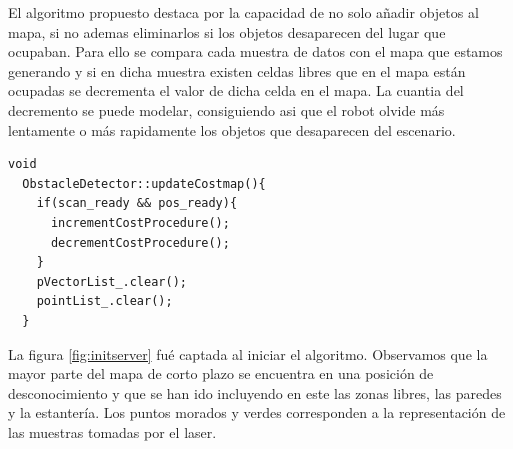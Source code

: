 El algoritmo propuesto destaca por la capacidad de no solo añadir objetos al mapa, si no ademas eliminarlos si los objetos desaparecen del lugar que ocupaban. Para ello se compara cada muestra de datos con el mapa que estamos generando y si en dicha muestra existen celdas libres que en el mapa están ocupadas se decrementa el valor de dicha celda en el mapa. La cuantia del decremento se puede modelar, consiguiendo asi que el robot olvide más lentamente o más rapidamente los objetos que desaparecen del escenario.\\

\renewcommand{\lstlistingname}{Código}
\begin{lstlisting}[caption=Función que actualiza el mapa en cada iteración, label={lst:updatecostmap}]
  void
  ObstacleDetector::updateCostmap(){
    if(scan_ready && pos_ready){
      incrementCostProcedure();
      decrementCostProcedure();
    }
    pVectorList_.clear();
    pointList_.clear();
  }
\end{lstlisting}

La figura \ref{fig:initserver} fué captada al iniciar el algoritmo. Observamos que la mayor parte del mapa de corto plazo se encuentra en una posición de desconocimiento y que se han ido incluyendo en este las zonas libres, las paredes y la estantería. Los puntos morados y verdes corresponden a la representación de las muestras tomadas por el laser.

